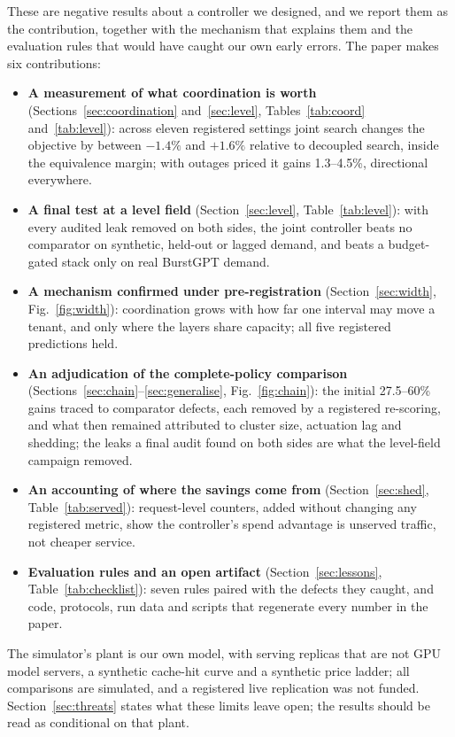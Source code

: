 These are negative results about a controller we designed, and we report
them as the contribution, together with the mechanism that explains them
and the evaluation rules that would have caught our own early errors. The
paper makes six contributions:
\begin{itemize}
\item \textbf{A measurement of what coordination is worth}
  (Sections~\ref{sec:coordination} and~\ref{sec:level},
  Tables~\ref{tab:coord} and~\ref{tab:level}): across eleven registered
  settings joint search changes the objective by between $-1.4\%$ and
  $+1.6\%$ relative to decoupled search, inside the equivalence margin; with
  outages priced it gains 1.3--4.5\%, directional everywhere.
\item \textbf{A final test at a level field}
  (Section~\ref{sec:level}, Table~\ref{tab:level}): with every audited
  leak removed on both sides, the joint controller beats no comparator on
  synthetic, held-out or lagged demand, and beats a budget-gated stack only
  on real BurstGPT demand.
\item \textbf{A mechanism confirmed under pre-registration}
  (Section~\ref{sec:width}, Fig.~\ref{fig:width}): coordination grows with
  how far one interval may move a tenant, and only where the layers share
  capacity; all five registered predictions held.
\item \textbf{An adjudication of the complete-policy comparison}
  (Sections~\ref{sec:chain}--\ref{sec:generalise}, Fig.~\ref{fig:chain}):
  the initial 27.5--60\% gains traced to comparator defects, each removed by
  a registered re-scoring, and what then remained attributed to cluster
  size, actuation lag and shedding; the leaks a final audit found on both
  sides are what the level-field campaign removed.
\item \textbf{An accounting of where the savings come from}
  (Section~\ref{sec:shed}, Table~\ref{tab:served}): request-level counters,
  added without changing any registered metric, show the controller's
  spend advantage is unserved traffic, not cheaper service.
\item \textbf{Evaluation rules and an open artifact}
  (Section~\ref{sec:lessons}, Table~\ref{tab:checklist}): seven rules paired
  with the defects they caught, and code, protocols, run data and scripts
  that regenerate every number in the paper.
\end{itemize}

The simulator's plant is our own model, with serving replicas that are not
GPU model servers, a synthetic cache-hit curve and a synthetic price
ladder; all comparisons are simulated, and a registered live replication
was not funded. Section~\ref{sec:threats} states what these limits leave
open; the results should be read as conditional on that plant.

